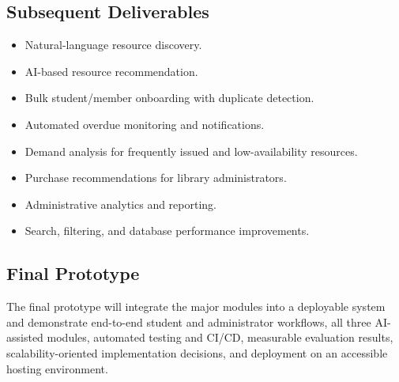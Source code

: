 \documentclass[11pt,a4paper]{article}
\begin{document}
\subsection{Subsequent Deliverables}
\begin{itemize}
    \item Natural-language resource discovery.
    \item AI-based resource recommendation.
    \item Bulk student/member onboarding with duplicate detection.
    \item Automated overdue monitoring and notifications.
    \item Demand analysis for frequently issued and low-availability resources.
    \item Purchase recommendations for library administrators.
    \item Administrative analytics and reporting.
    \item Search, filtering, and database performance improvements.
\end{itemize}

\subsection{Final Prototype}
The final prototype will integrate the major modules into a deployable system and demonstrate end-to-end student and administrator workflows, all three AI-assisted modules, automated testing and CI/CD, measurable evaluation results, scalability-oriented implementation decisions, and deployment on an accessible hosting environment.
\end{document}
